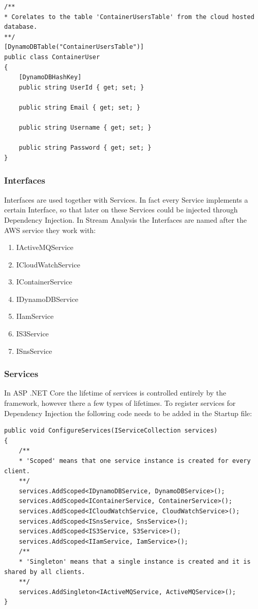 \begin{lstlisting}
/**
* Corelates to the table 'ContainerUsersTable' from the cloud hosted database.
**/
[DynamoDBTable("ContainerUsersTable")]
public class ContainerUser
{
	[DynamoDBHashKey]
	public string UserId { get; set; }
	
	public string Email { get; set; }
	
	public string Username { get; set; }
	
	public string Password { get; set; }
}
\end{lstlisting}

\subsubsection{Interfaces}
\label{chap:04:02:03:05}

Interfaces are used together with Services. In fact every Service implements a certain Interface, so that later on these Services could be injected through Dependency Injection. In Stream Analysis the Interfaces are named after the AWS service they work with:
\begin{enumerate}
	\item IActiveMQService
	\item ICloudWatchService
	\item IContainerService
	\item IDynamoDBService
	\item IIamService
	\item IS3Service
	\item ISnsService
\end{enumerate}

\subsubsection{Services}
\label{chap:04:02:03:05}

In ASP .NET Core the lifetime of services is controlled entirely by the framework, however there a few types of lifetimes. To register services for Dependency Injection the following code needs to be added in the Startup file:

\begin{lstlisting}
public void ConfigureServices(IServiceCollection services)
{
	/**
	* 'Scoped' means that one service instance is created for every client.
	**/
	services.AddScoped<IDynamoDBService, DynamoDBService>();
	services.AddScoped<IContainerService, ContainerService>();
	services.AddScoped<ICloudWatchService, CloudWatchService>();
	services.AddScoped<ISnsService, SnsService>();
	services.AddScoped<IS3Service, S3Service>();
	services.AddScoped<IIamService, IamService>();
	/**
	* 'Singleton' means that a single instance is created and it is shared by all clients.
	**/
	services.AddSingleton<IActiveMQService, ActiveMQService>();
}
\end{lstlisting}

